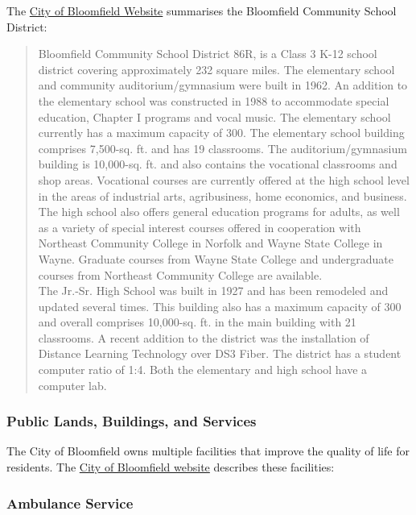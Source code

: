\noindent The \href{https://bloomfieldnebraska.com/education/}{City of Bloomfield Website} summarises the Bloomfield Community School District:

\begin{quote}
    Bloomfield Community School District 86R, is a Class 3 K-12 school district covering approximately 232 square miles. The elementary school and community auditorium/gymnasium were built in 1962. An addition to the elementary school was constructed in 1988 to accommodate special education, Chapter I programs and vocal music. The elementary school currently has a maximum capacity of 300. The elementary school building comprises 7,500-sq. ft. and has 19 classrooms. The auditorium/gymnasium building is 10,000-sq. ft. and also contains the vocational classrooms and shop areas. Vocational courses are currently offered at the high school level in the areas of industrial arts, agribusiness, home economics, and business. The high school also offers general education programs for adults, as well as a variety of special interest courses offered in cooperation with Northeast Community College in Norfolk and Wayne State College in Wayne. Graduate courses from Wayne State College and undergraduate courses from Northeast Community College are available.\\

    The Jr.-Sr. High School was built in 1927 and has been remodeled and updated several times. This building also has a maximum capacity of 300 and overall comprises 10,000-sq. ft. in the main building with 21 classrooms. A recent addition to the district was the installation of Distance Learning Technology over DS3 Fiber. The district has a student computer ratio of 1:4. Both the elementary and high school have a computer lab.
\end{quote}

\pagebreak
\subsubsection*{Public Lands, Buildings, and Services}

\noindent The City of Bloomfield owns multiple facilities that improve the quality of life for residents. The \href{https://bloomfieldnebraska.com/our-community/}{City of Bloomfield website} describes these facilities:

\subsubsection*{Ambulance Service}

